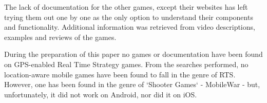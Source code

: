 The lack of documentation for the other games, except their websites has left
trying them out one by one as the only option to understand their components and
functionality. Additional information was retrieved from video descriptions,
examples and reviews of the games.\newline

During the preparation of this paper no games or documentation have been found
on GPS-enabled Real Time Strategy games. From the searches performed, no
location-aware mobile games have been found to fall in the genre of RTS.
However, one has been found in the genre of `Shooter Games` - MobileWar
- but, unfortunately, it did not work on Android, nor did it on iOS.\newline

